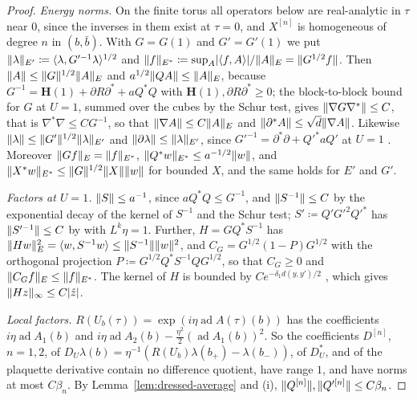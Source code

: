 \documentclass[11pt]{preprint}
\DeclarePairedDelimiter{\abs}{\lvert}{\rvert}
\DeclarePairedDelimiter{\norm}{\lVert}{\rVert}
\numberwithin{equation}{section}
\theoremstyle{definition}
\theoremstyle{remark}
\theoremstyle{plain}
\begin{document}
\begin{proof}
\emph{Energy norms.} On the finite torus all operators below are real-analytic in $\tau$ near $0$, since the inverses in them exist at $\tau = 0$, and $X^{[n]}$ is homogeneous of degree $n$ in $(b, \bar b)$. With $G = G(1)$ and $G' = G'(1)$ we put $\norm{\lambda}_{E'} \coloneqq \langle\lambda, G'^{-1}\lambda\rangle^{1/2}$ and $\norm{f}_{E^*} \coloneqq \sup_A\abs{\langle f, A \rangle}/\norm{A}_E = \norm{G^{1/2}f}$. Then $\norm{A} \leq \norm{G}^{1/2}\norm{A}_E$ and $a^{1/2}\norm{QA} \leq \norm{A}_E$, because $G^{-1} = \mathbf H(1) + \partial R\partial^* + aQ^*Q$ with $\mathbf H(1), \partial R\partial^* \geq 0$; the block-to-block bound \cite[(3.46), p.~398]{BalabanPBG} for $G$ \cite[Theorem~3.3, p.~399]{BalabanPBG} at $U = 1$, summed over the cubes by the Schur test, gives $\norm{\nabla G\nabla^*} \leq C$, that is $\nabla^*\nabla \leq CG^{-1}$, so that $\norm{\nabla A} \leq C\norm{A}_E$ and $\norm{\partial^*A} \leq \sqrt d\norm{\nabla A}$. Likewise $\norm{\lambda} \leq \norm{G'}^{1/2}\norm{\lambda}_{E'}$ and $\norm{\partial\lambda} \leq \norm{\lambda}_{E'}$, since $G'^{-1} = \partial^*\partial + Q'^*aQ'$ at $U = 1$ \cite[(3.23)--(3.24), p.~394]{BalabanPBG}. Moreover $\norm{Gf}_E = \norm{f}_{E^*}$, $\norm{Q^*w}_{E^*} \leq a^{-1/2}\norm{w}$, and $\norm{X^*w}_{E^*} \leq \norm{G}^{1/2}\norm{X}\norm{w}$ for bounded $X$, and the same holds for $E'$ and $G'$.

\emph{Factors at $U = 1$.} $\norm{S} \leq a^{-1}$, since $aQ^*Q \leq G^{-1}$, and $\norm{S^{-1}} \leq C$ by the exponential decay of the kernel of $S^{-1}$ \cite[(3.132), p.~422]{BalabanPBG} and the Schur test; $S' \coloneqq Q'G'^2Q'^*$ has $\norm{S'^{-1}} \leq C$ by \cite[Theorem~3.2, (3.48), p.~398]{BalabanPBG} with $L^k\eta = 1$. Further, $H = GQ^*S^{-1}$ has $\norm{Hw}_E^2 = \langle w, S^{-1}w \rangle \leq \norm{S^{-1}}\norm{w}^2$, and $C_G = G^{1/2}(1 - P)G^{1/2}$ with the orthogonal projection $P \coloneqq G^{1/2}Q^*S^{-1}QG^{1/2}$, so that $C_G \geq 0$ and $\norm{C_Gf}_E \leq \norm{f}_{E^*}$. The kernel of $H$ is bounded by $Ce^{-\delta_1d(y, y')/2}$ \cite[(3.133), p.~422]{BalabanPBG}, which gives $\norm{Hz}_\infty \leq C\abs{\hat z}$.

\emph{Local factors.} $R(U_b(\tau)) = \exp(i\eta\operatorname{ad}A(\tau)(b))$ has the coefficients $i\eta\operatorname{ad}A_1(b)$ and $i\eta\operatorname{ad}A_2(b) - \frac{\eta^2}{2}(\operatorname{ad}A_1(b))^2$. So the coefficients $D^{[n]}$, $n = 1, 2$, of $D_U\lambda(b) = \eta^{-1}(R(U_b)\lambda(b_+) - \lambda(b_-))$, of $D_U^*$, and of the plaquette derivative \cite[(3.4), p.~391]{BalabanPBG} contain no difference quotient, have range $1$, and have norms at most $C\beta_n$. By Lemma~\ref{lem:dressed-average} and (i), $\norm{Q^{[n]}}, \norm{Q'^{[n]}} \leq C\beta_n$.


\end{proof}
\end{document}
